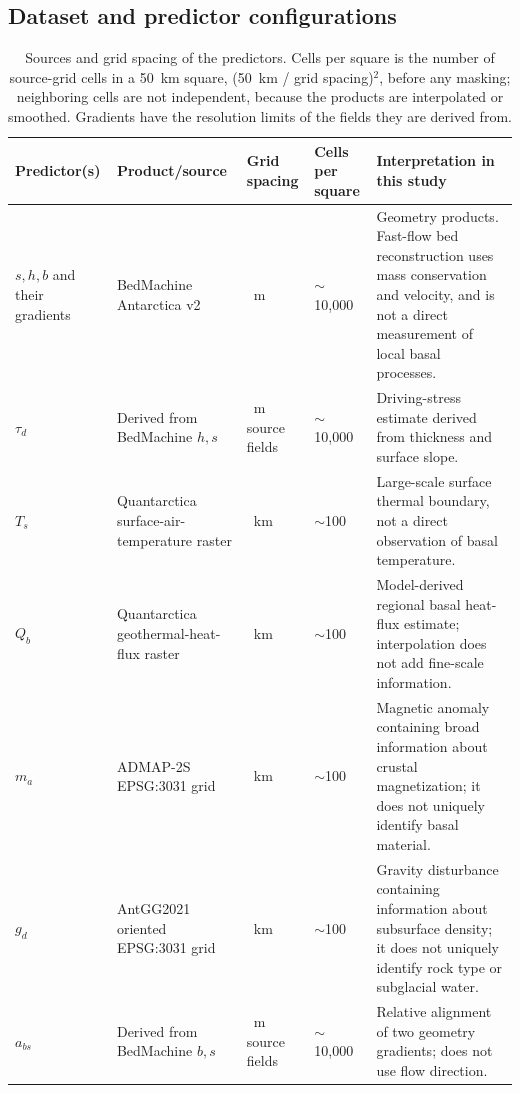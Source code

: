 \documentclass[review,jog]{igs}
\providecommand{\toprule}{\hline}
\providecommand{\midrule}{\hline}
\providecommand{\bottomrule}{\hline}
\begin{document}
\subsection{Dataset and predictor configurations}

\begin{table}
\caption{Sources and grid spacing of the predictors. Cells per square is the number of source-grid cells in a 50~km square, (50~km / grid spacing)$^2$, before any masking; neighboring cells are not independent, because the products are interpolated or smoothed. Gradients have the resolution limits of the fields they are derived from.}
\label{tab:predictor_provenance}
\centering\scriptsize
\setlength{\tabcolsep}{3pt}
\begin{tabular}{>{\raggedright\arraybackslash}p{}
                >{\raggedright\arraybackslash}p{}
                >{\centering\arraybackslash}p{}
                >{\centering\arraybackslash}p{}
                >{\raggedright\arraybackslash}p{}}
\toprule
Predictor(s) & Product/source & Grid spacing & Cells per square & Interpretation in this study\\
\midrule
$s,h,b$ and their gradients & BedMachine Antarctica v2 & 500~m & $\sim$10,000 & Geometry products. Fast-flow bed reconstruction uses mass conservation and velocity, and is not a direct measurement of local basal processes.\\
$\tau_d$ & Derived from BedMachine $h,s$ & 500~m source fields & $\sim$10,000 & Driving-stress estimate derived from thickness and surface slope.\\
$T_s$ & Quantarctica surface-air-temperature raster & 5~km & $\sim$100 & Large-scale surface thermal boundary, not a direct observation of basal temperature.\\
$Q_b$ & Quantarctica geothermal-heat-flux raster & 5~km & $\sim$100 & Model-derived regional basal heat-flux estimate; interpolation does not add fine-scale information.\\
$m_a$ & ADMAP-2S EPSG:3031 grid & 5~km & $\sim$100 & Magnetic anomaly containing broad information about crustal magnetization; it does not uniquely identify basal material.\\
$g_d$ & AntGG2021 oriented EPSG:3031 grid & 5~km & $\sim$100 & Gravity disturbance containing information about subsurface density; it does not uniquely identify rock type or subglacial water.\\
$a_{bs}$ & Derived from BedMachine $b,s$ & 500~m source fields & $\sim$10,000 & Relative alignment of two geometry gradients; does not use flow direction.\\
\bottomrule
\end{tabular}
\end{table}
\end{document}
